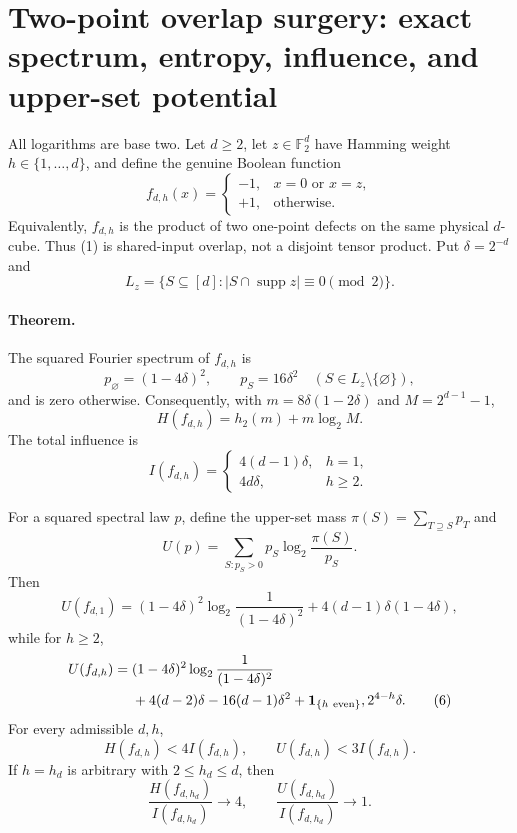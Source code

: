 \section*{Two-point overlap surgery: exact spectrum, entropy, influence, and upper-set potential}

All logarithms are base two.  Let $d\ge2$, let $z\in\mathbb F_2^d$ have
Hamming weight $h\in\{1,\ldots,d\}$, and define the genuine Boolean
function
\[
 f_{d,h}(x)=\begin{cases}-1,&x=0\text{ or }x=z,\\+1,&\text{otherwise}.
 \end{cases}                                                   \tag{1}
\]
Equivalently, $f_{d,h}$ is the product of two one-point defects on the
same physical $d$-cube.  Thus (1) is shared-input overlap, not a disjoint
tensor product.  Put $\delta=2^{-d}$ and
\[
 L_z=\{S\subseteq[d]:|S\cap\operatorname{supp}z|\equiv0\pmod2\}.
\]

\paragraph{Theorem.}
The squared Fourier spectrum of $f_{d,h}$ is
\[
 p_\varnothing=(1-4\delta)^2,\qquad
 p_S=16\delta^2\quad(S\in L_z\setminus\{\varnothing\}),       \tag{2}
\]
and is zero otherwise.  Consequently, with
$m=8\delta(1-2\delta)$ and $M=2^{d-1}-1$,
\[
 H(f_{d,h})=h_2(m)+m\log_2M.                                  \tag{3}
\]
The total influence is
\[
 I(f_{d,h})=\begin{cases}4(d-1)\delta,&h=1,\\4d\delta,&h\ge2.
 \end{cases}                                                   \tag{4}
\]

For a squared spectral law $p$, define the upper-set mass
$\pi(S)=\sum_{T\supseteq S}p_T$ and
\[
 U(p)=\sum_{S:p_S>0}p_S\log_2\frac{\pi(S)}{p_S}.
\]
Then
\[
 U(f_{d,1})=(1-4\delta)^2\log_2\frac1{(1-4\delta)^2}
 +4(d-1)\delta(1-4\delta),                                    \tag{5}
\]
while for $h\ge2$,
\[
 \begin{split}
 U(f_{d,h})={}&(1-4\delta)^2\log_2\frac1{(1-4\delta)^2}\\
 &+4(d-2)\delta-16(d-1)\delta^2
 +\mathbf1_{\{h\ {\rm even}\}},2^{4-h}\delta.              \tag{6}
 \end{split}
\]
For every admissible $d,h$,
\[
 H(f_{d,h})<4I(f_{d,h}),\qquad U(f_{d,h})<3I(f_{d,h}).          \tag{7}
\]
If $h=h_d$ is arbitrary with $2\le h_d\le d$, then
\[
 \frac{H(f_{d,h_d})}{I(f_{d,h_d})}\longrightarrow4,
 \qquad
 \frac{U(f_{d,h_d})}{I(f_{d,h_d})}\longrightarrow1.          \tag{8}
\]

